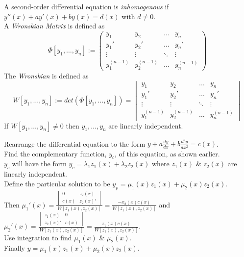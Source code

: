 \documentclass[11pt,a4paper]{article}
\begin{document}
\subtitle{Theory}
A second-order differential equation is \textit{inhomogenous} if $y''(x) + ay'(x) + by(x) = d(x)$ with $d \neq 0$.\\
A \textit{Wronskian Matrix} is defined as
$$\Phi[y_1, \dots, y_n] := \begin{pmatrix} y_1 & y_2 & \dots & y_n \\ y_1' & y_2' & \dots & y_n' \\ \vdots & \vdots & \ddots & \vdots \\ y_1^{(n-1)} & y_2^{(n-1)} & \dots & y_n^{(n-1)} \end{pmatrix}$$
The \textit{Wronskian} is defined as
$$W[y_1, \dots, y_n] := det(\Phi[y_1, \dots,y_n]) = \begin{vmatrix} y_1 & y_2 & \dots & y_n \\ y_1' & y_2' & \dots & y_n' \\ \vdots & \vdots & \ddots & \vdots \\ y_1^{(n-1)} & y_2^{(n-1)} & \dots & y_n^{(n-1)} \end{vmatrix}$$
If $W[y_1, \dots, y_n] \neq 0$ then $y_1, \dots, y_n$ are linearly independent.\\

\subtitle{Process}
Rearrange the differential equation to the form $y + a\frac{dy}{dx} + b\frac{d^2y}{dx^2} = c(x)$.\\
Find the complementary function, $y_c$, of this equation, as shown earlier.\\
$y_c$ will have the form $y_c = \lambda_1z_1(x) + \lambda_2z_2(x)$ where $z_1(x)$ \& $z_2(x)$ are linearly independent.\\
Define the particular solution to be $y_p = \mu_1(x)z_1(x) + \mu_2(x)z_2(x)$.\\
Then $\mu_1'(x)=\frac{\begin{vmatrix} 0 & z_2(x) \\ c(x) & z_2(x)'\end{vmatrix}}{W[z_1(x), z_2(x)]} = \frac{-x_2(x)c(x)}{W[z_1(x), z_2(x)]}$ and $\mu_2'(x)=\frac{\begin{vmatrix} z_1(x) & 0 \\ z_2(x)' & c(x)\end{vmatrix}}{W[z_1(x), z_2(x)]} = \frac{z_1(x)c(x)}{W[z_1(x), z_2(x)]}$.\\
Use integration to find $\mu_1(x)$ \& $\mu_2(x)$.\\
Finally $y = \mu_1(x)z_1(x) + \mu_2(x)z_2(x)$.\\
\end{document}

